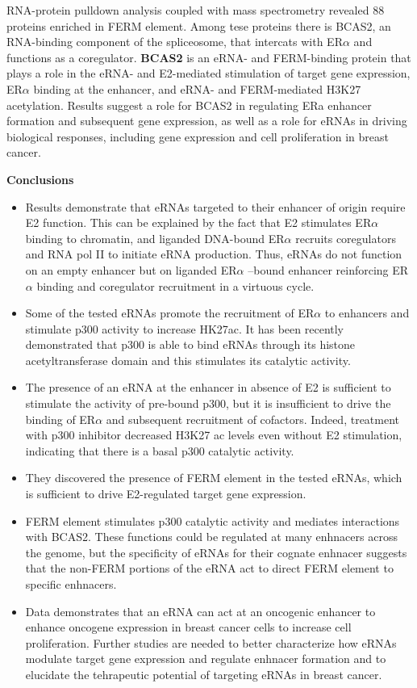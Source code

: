 RNA-protein pulldown analysis coupled with mass spectrometry revealed 88 proteins enriched in
FERM element. Among tese proteins there is BCAS2, an RNA-binding component of the spliceosome, that
intercats with ER$\alpha$ and functions as a coregulator. \textbf{BCAS2} is an eRNA- and FERM-binding protein that plays a role in the eRNA- and
E2-mediated stimulation of target gene expression, ER$\alpha$ binding at the
enhancer, and eRNA- and FERM-mediated H3K27 acetylation.  Results suggest a role for BCAS2 in regulating ERa enhancer formation and subsequent gene expression, as well as a role for eRNAs in driving biological responses, including gene expression and
cell proliferation in breast cancer.

\textbf{Conclusions}
\begin{itemize}
\tightlist
\item Results demonstrate that eRNAs targeted to their enhancer of origin require E2 function. This can be
explained by the fact that E2 stimulates ER$\alpha$ binding to chromatin, and liganded DNA-bound ER$\alpha$
recruits coregulators and RNA pol II to initiate eRNA production. Thus, eRNAs do not function on an
empty enhancer but on liganded ER$\alpha$ –bound enhancer reinforcing ER$\alpha$ binding and coregulator
recruitment in a virtuous cycle.
\item Some of the tested eRNAs promote the recruitment of ER$\alpha$ to enhancers and stimulate p300 activity
to increase HK27ac. It has been recently demonstrated that p300 is able to bind eRNAs through its
histone acetyltransferase domain and this stimulates its catalytic activity.
\item The presence of an eRNA at the enhancer in absence of E2 is sufficient to stimulate the activity of
pre-bound p300, but it is insufficient to drive the binding of ER$\alpha$ and subsequent recruitment of
cofactors. Indeed, treatment with p300 inhibitor decreased H3K27 ac levels even without E2
stimulation, indicating that there is a basal p300 catalytic activity.
\item They discovered the presence of FERM element in the tested eRNAs, which is sufficient to drive
E2-regulated target gene expression.
\item FERM element stimulates p300 catalytic activity and mediates interactions with BCAS2. These
functions could be regulated at many enhnacers across the genome, but the specificity of eRNAs
for their cognate enhnacer suggests that the non-FERM portions of the eRNA act to direct FERM
element to specific enhnacers.
\item Data demonstrates that an eRNA can act at an oncogenic enhancer to enhance oncogene
expression in breast cancer cells to increase cell proliferation. Further studies are needed to
better characterize how eRNAs modulate target gene expression and regulate enhnacer
formation and to elucidate the tehrapeutic potential of targeting eRNAs in breast cancer.
\end{itemize}

